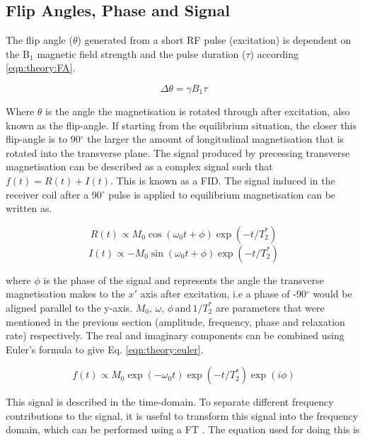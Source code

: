 \subsection{Flip Angles, Phase and Signal}

The flip angle ($\theta$) generated from a short \ac{RF} pulse (excitation) is dependent on the B$_1$ magnetic field strength and the pulse duration ($\tau$) according \ref{eqn:theory:FA}.

\begin{equation}
    \Delta\theta = \gamma B_1 \tau
    \label{eqn:theory:FA}
\end{equation}

Where $\theta$ is the angle the magnetisation is rotated through after excitation, also known as the flip-angle. If starting from the equilibrium situation, the closer this flip-angle is to 90$^\circ$ the larger the amount of longitudinal magnetisation that is rotated into the transverse plane. The signal produced by precessing transverse magnetisation can be described as a complex signal such that $f(t) = R(t) + I(t)$. This is known as a \ac{FID}. The signal induced in the receiver coil after a 90$^\circ$ pulse is applied to equilibrium magnetisation can be written as.

\begin{equation}
    R(t) \propto M_0\cos(\omega_0 t+ \phi)\exp(-t/T_2^*)
    \label{eqn:theory:real}
\end{equation}
\begin{equation}
    I(t) \propto -M_0\sin(\omega_0 t+ \phi)\exp(-t/T_2^*)
    \label{eqn:theory:imag}
\end{equation}

\noindent where $\phi$ is the phase of the signal and represents the angle the transverse magnetisation makes to the $x'$ axis after excitation, i.e a phase of -90$^\circ$ would be aligned parallel to the y-axis. $M_0, \, \omega, \, \phi \, \textrm{and} \, 1/T_2^*$ are parameters that were mentioned in the previous section (amplitude, frequency, phase and relaxation rate) respectively. The real and imaginary components can be combined using Euler's formula to give Eq. \ref{eqn:theory:euler}. 

\begin{equation}
    f(t) \propto M_0\exp(-\omega_0 t)\exp(-t/T_2^*)\exp(i\phi)
    \label{eqn:theory:euler}
\end{equation}

This signal is described in the time-domain. To separate different frequency contributions to the signal, it is useful to transform this signal into the frequency domain, which can be performed using a \ac{FT} \cite{Fourier1822TheorieChaleur}. The equation used for doing this is

